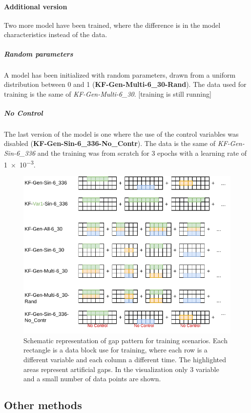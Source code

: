\documentclass{article}
\let\Oldsubsection\subsection
\renewcommand{\subsection}{\FloatBarrier\Oldsubsection}
\begin{document}
\paragraph{Additional version} Two more model have been trained, where the difference is in the model characteristics instead of the data.

\subparagraph{Random parameters} A model has been initialized with random parameters, drawn from a uniform distribution between 0 and 1 (\textbf{KF-Gen-Multi-6\_30-Rand}). The data used for training is the same of  \textit{KF-Gen-Multi-6\_30}. [training is still running]

\subparagraph{No Control} The last version of the model is one where the use of the control variables was disabled (\textbf{KF-Gen-Sin-6\_336-No\_Contr}). The data is the same of \textit{KF-Gen-Sin-6\_336} and the training was from scratch for \num{3} epochs with a learning rate of \num{1e-3}.

\begin{figure}
\centerline{\includegraphics[width=\textwidth]{training scenarios}}
\caption{Schematic representation of gap pattern for training scenarios. Each rectangle is a data block use for training, where each row is a different variable and each column a different time. The highlighted areas represent artificial gaps. In the visualization only 3 variable and a small number of data points are shown.}
\label{fig:training}
\end{figure}

\subsection{Other methods}
\end{document}
